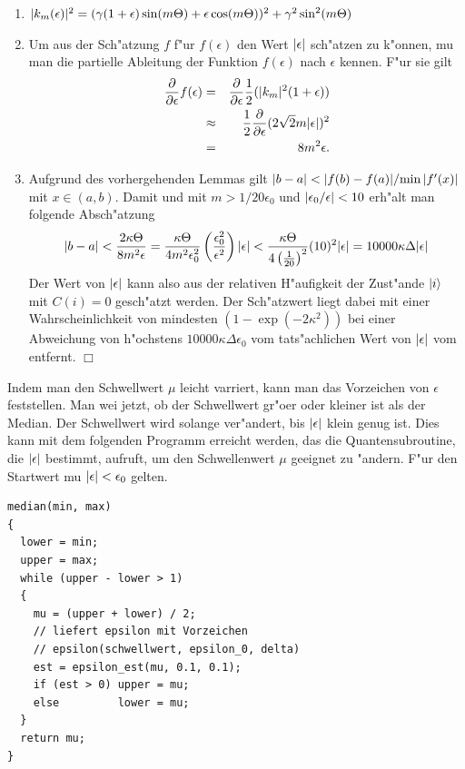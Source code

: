                \begin{enumerate}
                 \item $\vert k_m(\epsilon) \vert^2 = (\gamma(1 + \epsilon)\sin(m\Theta) + \epsilon\cos(m\Theta))^2 + \gamma^2\sin^2(m\Theta) $
                 \item Um aus der Sch"atzung $f$ f"ur $f(\epsilon)$ den Wert $\vert \epsilon \vert$ sch"atzen zu k"onnen, mu\3 man die partielle Ableitung der Funktion $f(\epsilon)$
                   nach $\epsilon$ kennen. F"ur sie gilt
                   \begin{eqnarray*}
                     {\partial\over\partial\epsilon}f(\epsilon) & =       & {\partial\over\partial\epsilon}\frac{1}{2}(\vert k_m \vert^2(1+\epsilon)) \\
                                                                & \approx & \frac{1}{2}{\partial\over\partial\epsilon}(2\sqrt{2}m\vert \epsilon \vert)^2 \\
                                                                & =       & 8m^2\epsilon.
                   \end{eqnarray*}
                 \item Aufgrund des vorhergehenden Lemmas gilt $\vert b-a \vert < {\vert f(b)-f(a) \vert}/{\min\vert f'(x) \vert}$ mit $x\in (a,b)$. Damit und mit
                       $m > {1}/{20\epsilon_0}$ und $\vert \epsilon_0 / \epsilon \vert<10$ erh"alt man 
                       folgende Absch"atzung
                       $$ \vert b-a \vert < \frac{2\kappa\Theta}{8m^2\epsilon} = \frac{\kappa\Theta}{4m^2\epsilon_0^2}\left(\frac{\epsilon_0^2}{\epsilon^2}\right)\vert \epsilon \vert <
                          \frac{\kappa\Theta}{4\left(\frac{1}{20}\right)^2}(10)^2\vert \epsilon \vert = 10000\kappa\Delta\vert \epsilon \vert $$
                       Der Wert von $\vert \epsilon \vert$ kann also aus der relativen H"aufigkeit der Zust"ande $\left| i \right>$ mit $C(i)=0$ gesch"atzt werden. Der Sch"atzwert liegt dabei
                       mit einer Wahrscheinlichkeit von mindesten $(1-\exp(-2\kappa^2))$ bei einer Abweichung von h"ochstens $10000\kappa\Delta\epsilon_0$ vom 
                       tats"achlichen Wert von $\vert \epsilon \vert$ vom entfernt. \hfill $\Box$
               \end{enumerate}
               Indem man den Schwellwert $\mu$ leicht varriert, kann man das Vorzeichen von $\epsilon$ feststellen. Man wei\3 jetzt, ob der Schwellwert gr"o\3er oder
               kleiner ist als der Median. Der Schwellwert wird solange ver"andert, bis $\vert \epsilon \vert$ klein genug ist. Dies kann mit dem folgenden
               Programm erreicht werden, das die Quantensubroutine, die $\vert \epsilon \vert$ bestimmt, aufruft, um den Schwellenwert $\mu$ geeignet zu "andern. F"ur den
               Startwert mu\3 $\vert \epsilon \vert < \epsilon_0$ gelten.
\newpage
\begin{verbatim}
median(min, max)
{
  lower = min;
  upper = max;
  while (upper - lower > 1)
  {
    mu = (upper + lower) / 2;
    // liefert epsilon mit Vorzeichen
    // epsilon(schwellwert, epsilon_0, delta)
    est = epsilon_est(mu, 0.1, 0.1); 
    if (est > 0) upper = mu;
    else         lower = mu;
  }
  return mu;
}
\end{verbatim}

